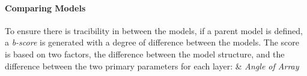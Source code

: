 \paragraph*{Comparing Models}
To ensure there is tracibility in between the models, if a parent model is defined, a \textit{b-score} is generated with a degree of difference between the models. The score is based on two factors, the difference between the model structure, and the difference between the two primary parameters for each layer:  & \textit{Angle of Array}
